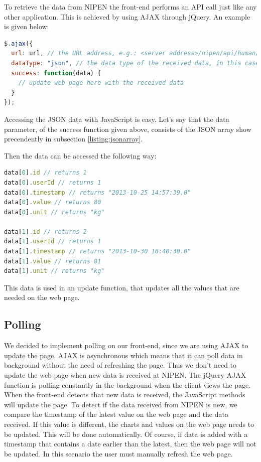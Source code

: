 To retrieve the data from NIPEN the front-end performs an API call just like any other application.
This is achieved by using AJAX through jQuery. An example is given below:
\begin{lstlisting}[language=JavaScript]
$.ajax({
  url: url, // the URL address, e.g.: <server address>/nipen/api/human/weights
  dataType: "json", // the data type of the received data, in this case a JSON string
  success: function(data) {
	// update web page here with the received data
  }
});
\end{lstlisting}

Accessing the JSON data with JavaScript is easy.
Let's say that the data parameter, of the success function given above, consists of the JSON array show precendently 
in subsection \ref{listing:jsonarray}.

Then the data can be accessed the following way:
\begin{lstlisting}[language=JavaScript]
data[0].id // returns 1
data[0].userId // returns 1
data[0].timestamp // returns "2013-10-25 14:57:39.0"
data[0].value // returns 80
data[0].unit // returns "kg"

data[1].id // returns 2
data[1].userId // returns 1
data[1].timestamp // returns "2013-10-30 16:40:30.0"
data[1].value // returns 81
data[1].unit // returns "kg"
\end{lstlisting}

This data is used in an update function, that updates all the values that are needed on the web page.

\subsection{Polling}

We decided to implement polling on our front-end, since we are using AJAX to update the page.
AJAX is asynchronous which means that it can poll data in background without the need of refreshing the page.
Thus we don't need to update the web page when new data is received at NIPEN.
The jQuery AJAX function is polling constantly in the background when the client views the page.
When the front-end detects that new data is received, the JavaScript methods will update the page.
To detect if the data received from NIPEN is new, we compare the timestamp of the latest value on the web page and the data received.
If this value is different, the charts and values on the web page needs to be updated.
This will be done automatically.
Of course, if data is added with a timestamp that contains a date earlier than the latest, then the web page 
will not be updated.
In this scenario the user must manually refresh the web page.

